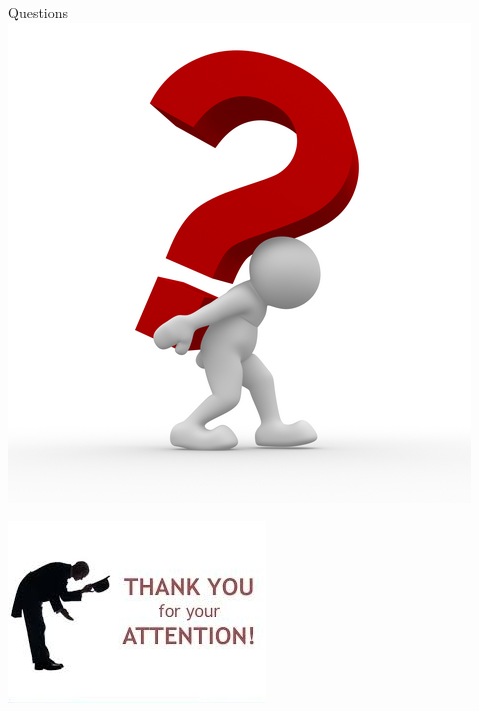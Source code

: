 \documentclass[12pt]{beamer}
\begin{document}
	\begin{frame}
	\begin{center}
	{\Huge Questions}
    \includegraphics[scale=0.3]{quest}
	\end{center}
	\end{frame}
	
	\begin{frame}
		\begin{center}
		\includegraphics{thx}
		\end{center}
	\end{frame}
\end{document}
